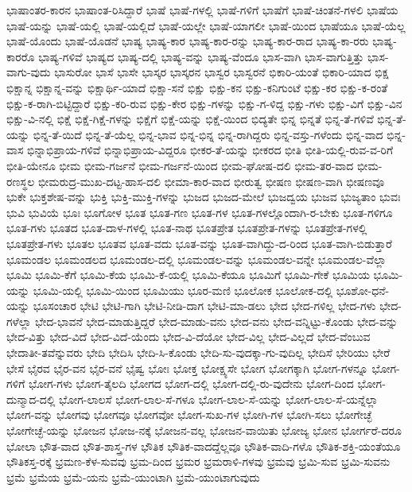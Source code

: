 {ಭಾಷಾಂತರ-ಕಾರನ
ಭಾಷಾಂತ-ರಿಸಿದ್ದಾರೆ
ಭಾಷೆ
ಭಾಷೆ-ಗಳಲ್ಲಿ
ಭಾಷೆ-ಗಳಿಗೆ
ಭಾಷೆಗೆ
ಭಾಷೆ-ಚಿಂತನೆ-ಗಳಲಿ
ಭಾಷೆಯ
ಭಾಷೆ-ಯನ್ನು
ಭಾಷೆ-ಯಲ್ಲಿ
ಭಾಷೆ-ಯಲ್ಲಿದೆ
ಭಾಷೆ-ಯಲ್ಲೇ
ಭಾಷೆ-ಯಾಗಲೀ
ಭಾಷೆ-ಯಿಂದ
ಭಾಷೆಯೂ
ಭಾಷೆ-ಯೆಲ್ಲ
ಭಾಷೆ-ಯೊಂದು
ಭಾಷೆ-ಯೊಡನೆ
ಭಾಷ್ಯ
ಭಾಷ್ಯ-ಕಾರ
ಭಾಷ್ಯ-ಕಾರ-ರನ್ನು
ಭಾಷ್ಯ-ಕಾರ-ರಾದ
ಭಾಷ್ಯ-ಕಾ-ರರು
ಭಾಷ್ಯ-ಕಾರರೊ
ಭಾಷ್ಯ-ಗಳಿವೆ
ಭಾಷ್ಯದ
ಭಾಷ್ಯ-ದಲ್ಲಿ
ಭಾಷ್ಯ-ವನ್ನು
ಭಾಷ್ಯ-ವೆಂದೂ
ಭಾಸ-ವಾಗಿ
ಭಾಸ-ವಾಗುತ್ತಿತ್ತು
ಭಾಸ-ವಾಗು-ವುದು
ಭಾಸುರೋ
ಭಾಸೆ
ಭಾಸೇ
ಭಾಸ್ಕರ
ಭಾಸ್ಕರನ
ಭಾಸ್ವರ
ಭಾಸ್ವರನೆ
ಭಿಕಾರಿ-ಯಂತೆ
ಭಿಕಾರಿ-ಯಾದ
ಭಿಕ್ಷ
ಭಿಕ್ಷಾನ್ನ
ಭಿಕ್ಷಾನ್ನ-ವನ್ನು
ಭಿಕ್ಷಾರ್ಥಿ-ಯಾದೆ
ಭಿಕ್ಷಾ-ಸನೆ
ಭಿಕ್ಷು
ಭಿಕ್ಷು-ಕನ
ಭಿಕ್ಷು-ಕನಿಗುಂಟೆ
ಭಿಕ್ಷು-ಕರ
ಭಿಕ್ಷು-ಕ-ರಂತೆ
ಭಿಕ್ಷು-ಕ-ರಾಗಿ-ಬಿಟ್ಟಿದ್ದಾರೆ
ಭಿಕ್ಷು-ಕರಿ-ರುವ
ಭಿಕ್ಷು-ಕೇರ
ಭಿಕ್ಷು-ಗಳನ್ನು
ಭಿಕ್ಷು-ಗ-ಳಿದ್ದ
ಭಿಕ್ಷು-ಗಳು
ಭಿಕ್ಷು-ವಿಗೆ
ಭಿಕ್ಷು-ವಿನ
ಭಿಕ್ಷು-ವಿ-ನಲ್ಲಿ
ಭಿಕ್ಷೆ
ಭಿಕ್ಷೆ-ಗಿಕ್ಷೆ-ಗಳನ್ನು
ಭಿಕ್ಷೆಗೆ
ಭಿಕ್ಷೆ-ಯನ್ನು
ಭಿಕ್ಷೆ-ಯಿಂದ
ಭಿದ್ಯತೇ
ಭಿನ್ನ
ಭಿನ್ನತೆ
ಭಿನ್ನ-ತೆ-ಗಳಿವೆ
ಭಿನ್ನ-ತೆ-ಯನ್ನು
ಭಿನ್ನ-ತೆ-ಯಿದೆ
ಭಿನ್ನ-ತೆ-ಯೆಲ್ಲ
ಭಿನ್ನ-ಭಾವ
ಭಿನ್ನ-ಭಿನ್ನ
ಭಿನ್ನ-ರಾಗಿದ್ದರು
ಭಿನ್ನ-ವಸ್ತು-ಗಳೆಂದು
ಭಿನ್ನ-ವಾದ
ಭಿನ್ನ-ವಾಸ
ಭಿನ್ನಾಭಿಪ್ರಾಯ-ಗಳಿವೆ
ಭಿನ್ನಾಭಿಪ್ರಾಯ-ವಿದ್ದರೂ
ಭೀಕರ-ತೆ-ಯನ್ನು
ಭೀಕರದ
ಭೀತಿ
ಭೀತಿ-ಯಲ್ಲಿ-ರುವ-ವ-ರಿಗೆ
ಭೀತಿ-ಯೇನೂ
ಭೀಮ
ಭೀಮ-ಗರ್ಜನೆ
ಭೀಮ-ಗರ್ಜನೆ-ಯಿಂದ
ಭೀಮ-ಘೋಷ-ದಲಿ
ಭೀಮ-ತರ-ವಾದ
ಭೀಮ-ರಣಸ್ಥಲ
ಭೀಮರುದ್ರ-ಮುಖ-ದಟ್ಟ-ಹಾಸ-ದಲಿ
ಭೀಮಾ-ಕಾರ-ವಾದ
ಭೀರುತ್ವ
ಭೀಷಣ
ಭೀಷಣ-ವಾಗಿ
ಭೀಷಣವೂ
ಭುಕೇ
ಭುಕ್ತಶೇಷ-ವನ್ನು
ಭುಕ್ತಿ
ಭುಕ್ತಿ-ಮುಕ್ತಿ-ಗಳನ್ನು
ಭುಜದ
ಭುಜದ-ಮೇಲೆ
ಭುಜದ್ವಯ
ಭುಜವ
ಭುಜ್ಯತಾಂ
ಭುವಃ
ಭುವಿ
ಭುವಿಯೆ
ಭೂಃ
ಭೂಗೋಳ
ಭೂತ
ಭೂತ-ಗಣ
ಭೂತ-ಗಳ
ಭೂತ-ಗಳಲ್ಲೊಂದಾಗಿ-ರ-ಬೇಕು
ಭೂತ-ಗಳಿಗೂ
ಭೂತ-ಗಳು
ಭೂತದ
ಭೂತ-ದಾಳ-ಗಳಲ್ಲಿ
ಭೂತ-ನಾಥ
ಭೂತಪ್ರೇತ
ಭೂತಪ್ರೇತ-ಗಳನ್ನು
ಭೂತಪ್ರೇತ-ಗಳಲ್ಲಿ
ಭೂತಪ್ರೇತ-ಗಳು
ಭೂತಲ
ಭೂತವ
ಭೂತ-ವದು
ಭೂತ-ವನ್ನು
ಭೂತ-ವಾಗಿದ್ದು-ದ-ರಿಂದ
ಭೂತ-ವಾಗಿ-ಬಿಡುತ್ತಾರೆ
ಭೂಮಂಡಲ
ಭೂಮಂಡಲದ
ಭೂಮಂಡಲ-ದಲ್ಲಿ
ಭೂಮಂಡಲ-ವನ್ನು
ಭೂಮಂಡಲ-ವನ್ನೇ
ಭೂಮಂಡಲ-ವೆಲ್ಲಾ
ಭೂಮಿ
ಭೂಮಿ-ಕೆಗೆ
ಭೂಮಿ-ಕೆಯ
ಭೂಮಿ-ಕೆ-ಯಲ್ಲಿ
ಭೂಮಿ-ಕೆಯೂ
ಭೂಮಿಗೆ
ಭೂಮಿ-ಗೇಕೆ
ಭೂಮಿಯ
ಭೂಮಿ-ಯನ್ನು
ಭೂಮಿ-ಯಲ್ಲಿ
ಭೂಮಿ-ಯಿಂದ
ಭೂಮಿಯು
ಭೂರ-ಮಣಿ
ಭೂಲೋಕ
ಭೂಲೋಕ-ದಲ್ಲಿ
ಭೂಶೋ-ಧನೆ-ಯನ್ನು
ಭೂಸಂಚಾರ
ಭೇಟಿ
ಭೇಟಿ-ಗಾಗಿ
ಭೇಟಿ-ನೀಡಿ-ದಾಗ
ಭೇಟಿ-ಮಾ-ಡಲು
ಭೇದ
ಭೇದ-ಗಳಿಲ್ಲ
ಭೇದ-ಗಳು
ಭೇದ-ಗಳೆಲ್ಲಾ
ಭೇದ-ಭಾವನೆ
ಭೇದ-ಮಾಡುತ್ತಿದ್ದರೆ
ಭೇದ-ಮಾಡು-ವನು
ಭೇದ-ವನು
ಭೇದ-ವನ್ನಿಟ್ಟು-ಕೊಂಡು
ಭೇದ-ವನ್ನು
ಭೇದ-ವಿತ್ತು
ಭೇದ-ವಿದೆ
ಭೇದ-ವಿದೆ-ಯೆಂದು
ಭೇದ-ವಿ-ದೆಯೋ
ಭೇದ-ವಿಲ್ಲ
ಭೇದ-ವಿಲ್ಲದೆ
ಭೇದ-ವೆಂಬುವ
ಭೇದಾತೀ-ತವೆನ್ನುವರು
ಭೇದಿ
ಭೇದಿಸಿ
ಭೇದಿ-ಸಿ-ಕೊಂಡು
ಭೇದಿ-ಸು-ವುದಕ್ಕಾ-ಗು-ವುದಿಲ್ಲ
ಭೇದಿಸೆ
ಭೇರಿಯು
ಭೇರೆ
ಭೇಸೆ
ಭೈರವ
ಭೈರ-ವನ
ಭೈರ-ವನೆ
ಭೈಷ್ವ
ಭೋಃ
ಭೋಕ್ತ
ಭೋಕ್ಷ್ಯಸೇ
ಭೋಗ
ಭೋಗಕ್ಕಾಗಿ
ಭೋಗ-ಗಳನ್ನೂ
ಭೋಗ-ಗಳಿಗೆ
ಭೋಗ-ಗಳು
ಭೋಗ-ತೈಲದಿ
ಭೋಗದ
ಭೋಗ-ದಲ್ಲಿ
ಭೋಗ-ದಲ್ಲಿ-ರು-ವುದೇನು
ಭೋಗ-ದಿಂದ
ಭೋಗ-ದುನ್ಮಾದ-ದಲ್ಲಿ
ಭೋಗ-ಲಾಲಸೆ
ಭೋಗ-ಲಾಲ-ಸೆ-ಗಳೂ
ಭೋಗ-ಲಾಲ-ಸೆ-ಯನ್ನು
ಭೋಗ-ಲಾಲ-ಸೆ-ಯನ್ನೆಲ್ಲಾ
ಭೋಗ-ವನ್ನು
ಭೋಗವು
ಭೋಗವೂ
ಭೋಗವೋ
ಭೋಗ-ಸುಖ-ಗಳ
ಭೋಗಿ-ಗಳ
ಭೋಗಿ-ಸಲು
ಭೋಗೇಚ್ಛೆ
ಭೋಗೇಚ್ಛೆ-ಯನ್ನು
ಭೋಜನ
ಭೋಜ-ನಕ್ಕೆ
ಭೋಜನ-ವಲ್ಲ
ಭೋಜನ-ವಾಯಿತು
ಭೋಜ್ಯ
ಭೋನ
ಭೋರ್ಗರೆ-ದರೂ
ಭೋಲಾ
ಭೌತ-ವಾದ
ಭೌತ-ಶಾಸ್ತ್ರ-ಗಳ
ಭೌತಿಕ
ಭೌತಿಕ-ವಾದದ್ದೆಲ್ಲವೂ
ಭೌತಿಕ-ವಾದಿ-ಗಳೊ
ಭೌತಿಕ-ಶಕ್ತಿ-ಯಂತೆಯೂ
ಭೌತಿಕಸ್ತ-ರಕ್ಕೆ
ಭ್ರಮಣ-ಕೆಳ-ಸುವವು
ಭ್ರಮ-ದಿಂದ
ಭ್ರಮರ
ಭ್ರಮರಾಳಿ-ಗಳವು
ಭ್ರಮವು
ಭ್ರಮಿ-ಸುವ
ಭ್ರಮಿ-ಸುವನು
ಭ್ರಮೆ
ಭ್ರಮೆಯ
ಭ್ರಮೆ-ಯನು
ಭ್ರಮೆ-ಯುಂಟಾಗಿ
ಭ್ರಮೆ-ಯುಂಟಾಗುವುದು
}
